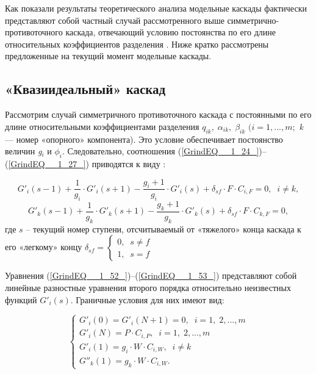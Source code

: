 Как показали результаты теоретического анализа модельные каскады фактически представляют собой частный случай рассмотренного выше симметрично-противоточного каскада, отвечающий условию постоянства по его длине относительных коэффициентов разделения \cite{sulaberidzeClassificationModelCascades2020}.  
Ниже кратко рассмотрены предложенные на текущий момент модельные каскады.

\subsection{«Квазиидеальный» каскад}

Рассмотрим случай симметричного противоточного каскада с постоянными по его длине относительными коэффициентами разделения $q_{ik} ,\; \alpha _{ik} ,\; \beta _{ik} $ $(i=1,...,m;$ \textit{k} --- номер «опорного» компонента). Это условие обеспечивает постоянство величин \textit{g${}_{i}$} и $\phi _{i} $. Следовательно, соотношения (\ref{GrindEQ__1_24_})--(\ref{GrindEQ__1_27_}) приводятся к виду \cite{sulaberidzeTeoriyaKaskadovDlya2011}:

\begin{equation} \label{GrindEQ__1_52_} 
  G'_{i} (s-1)+\frac{1}{g_{i}} \cdot G'_{i} (s+1)-\frac{g_{i} +1}{g_{i} }\cdot G'_{i} (s)+\delta _{sf} \cdot F \cdot C_{i,F} =0,\; \; i\ne k, 
  \end{equation} 
  \begin{equation} \label{GrindEQ__1_53_} 
  G'_{k} (s-1)+\frac{1}{g_{k}} \cdot G'_{k} (s+1)-\frac{g_{k} +1}{g_{k} }\cdot G'_{k} (s)+\delta _{sf} \cdot F \cdot C_{k,F} =0, 
\end{equation}
где $s$ – текущий номер ступени, отсчитываемый от «тяжелого» конца каскада к его «легкому» концу $\delta _{sf} =\left\{\begin{array}{l} {0,\; \; s\ne f} \\ {1,\; \; s=f} \end{array}\right.$

Уравнения (\ref{GrindEQ__1_52_})--(\ref{GrindEQ__1_53_}) представляют собой линейные разностные уравнения второго порядка относительно неизвестных функций $G'_{i} (s)$. Граничные условия для них имеют вид:

\begin{equation} \label{GrindEQ__1_54_} 
  \left\{\begin{array}{l} {G'_{i} (0)=G'_{i} (N+1)=0,\; \; i=1,\; 2,...,m} \\
    {G'_{i} (N)=P \cdot C_{i,P} ,\; \; i=1,\; 2,...,m} \\
    {G'_{i} (1)=g_{i} \cdot W \cdot C_{i,W} ,\; \; i\ne k} \\
    {G''_{k} (1)=g_{k} \cdot W \cdot C_{i,W} .} \end{array}\right.  
\end{equation} 

